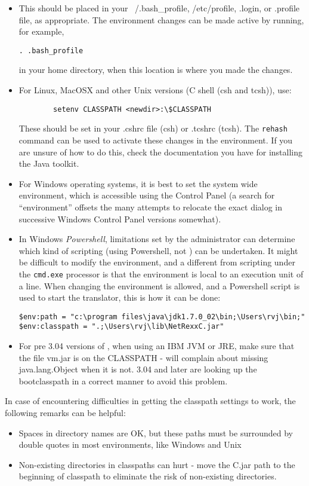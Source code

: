 \begin{itemize}
\item This should be placed
  in your ~/.bash\_profile, /etc/profile, .login, or .profile file, as
  appropriate. The environment changes can be made active by running,
  for example,
\begin{verbatim}
. .bash_profile
\end{verbatim}
in your home directory, when this location is where you made the changes.
\item For Linux, MacOSX and other Unix versions (C shell (csh and tcsh)), use:
\begin{verbatim}
        setenv CLASSPATH <newdir>:\$CLASSPATH 
\end{verbatim}
These should be set in your .cshrc file (csh) or .tcshrc (tcsh). The
\texttt{rehash} command can be used to activate these changes in the environment. If you are unsure of how to do this, check the
documentation you have for installing the Java toolkit.
\item For Windows operating systems, it is best to set the system wide
  environment, which is accessible using the Control Panel (a search
  for ``environment'' offsets the many attempts to relocate the exact
  dialog in successive Windows Control Panel versions somewhat).
\item In Windows \emph{Powershell}, limitations set by the
  administrator can determine which kind of scripting (using
  Powershell, not \nr) can be undertaken. It might be difficult to
  modify the environment, and a different from scripting under the
  \texttt{cmd.exe} processor is that the environment is local to an
  execution unit of a line. When changing the environment is allowed,
  and a Powershell script is used to start the \nr translator, this is
  how it can be done:
\begin{verbatim}
$env:path = "c:\program files\java\jdk1.7.0_02\bin;\Users\rvj\bin;"
$env:classpath = ".;\Users\rvj\lib\NetRexxC.jar"
\end{verbatim}
 \item For pre 3.04 versions of \nr{}, when using an IBM JVM or JRE, make sure that the file vm.jar is
   on the CLASSPATH - \nr{} will complain about missing
   java.lang.Object when it is not. \nr{} 3.04 and later are looking
   up the bootclasspath in a correct manner to avoid this problem.
\end{itemize}

In case of encountering difficulties in getting the classpath settings
to work, the following remarks can be helpful:
\begin{itemize}
\item Spaces in directory names are OK, but these paths must be
  surrounded by double quotes in most environments, like Windows and
  Unix
\item Non-existing directories in classpaths can hurt - move the
  \nr{}C.jar path to the beginning of classpath to eliminate the
  risk of non-existing directories.
\end{itemize}

